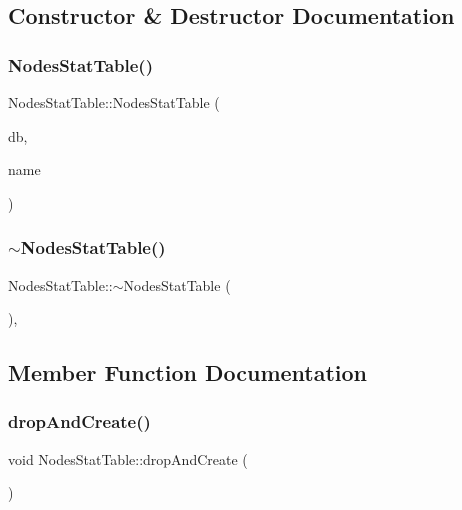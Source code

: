 \subsection{Constructor \& Destructor Documentation}
\mbox{\label{class_nodes_stat_table_a0634098ee5044cb1c45ee9f98ceda634}} 
\subsubsection{\texorpdfstring{NodesStatTable()}{NodesStatTable()}}
{\footnotesize\ttfamily Nodes\+Stat\+Table\+::\+Nodes\+Stat\+Table (\begin{DoxyParamCaption}\item[{std\+::shared\+\_\+ptr$<$ sqlite\+::\+S\+Q\+Lite\+Storage $>$}]{db,  }\item[{std\+::string}]{name }\end{DoxyParamCaption})}

\mbox{\label{class_nodes_stat_table_a760231eb30d44edb19df78f1744c38dd}} 
\subsubsection{\texorpdfstring{$\sim$NodesStatTable()}{~NodesStatTable()}}
{\footnotesize\ttfamily Nodes\+Stat\+Table\+::$\sim$\+Nodes\+Stat\+Table (\begin{DoxyParamCaption}{ }\end{DoxyParamCaption})\hspace{0.3cm}{\ttfamily [default]}, {\ttfamily [noexcept]}}



\subsection{Member Function Documentation}
\mbox{\label{class_nodes_stat_table_a867eaa1657a7125132dda8bdea8c0eae}} 
\subsubsection{\texorpdfstring{dropAndCreate()}{dropAndCreate()}}
{\footnotesize\ttfamily void Nodes\+Stat\+Table\+::drop\+And\+Create (\begin{DoxyParamCaption}{ }\end{DoxyParamCaption})}

